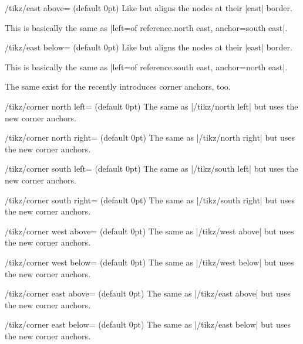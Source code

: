 \begin{stylekey}{/tikz/east above= (default 0pt)}
  Like  but aligns the nodes at their |east| border.
  
  This is basically the same as |left=of reference.north east, anchor=south east|.
\end{stylekey}
\begin{stylekey}{/tikz/east below= (default 0pt)}
  Like  but aligns the nodes at their |east| border.
  
  This is basically the same as |left=of reference.south east, anchor=north east|.
\end{stylekey}

The same exist for the recently introduces corner anchors, too.
\begin{stylekey}{/tikz/corner north left= (default 0pt)}
  The same as |/tikz/north left| but uses the new corner anchors.
\end{stylekey}
\begin{stylekey}{/tikz/corner north right= (default 0pt)}
  The same as |/tikz/north right| but uses the new corner anchors.
\end{stylekey}
\begin{stylekey}{/tikz/corner south left= (default 0pt)}
  The same as |/tikz/south left| but uses the new corner anchors.
\end{stylekey}
\begin{stylekey}{/tikz/corner south right= (default 0pt)}
  The same as |/tikz/south right| but uses the new corner anchors.
\end{stylekey}
\begin{stylekey}{/tikz/corner west above= (default 0pt)}
  The same as |/tikz/west above| but uses the new corner anchors.
\end{stylekey}
\begin{stylekey}{/tikz/corner west below= (default 0pt)}
  The same as |/tikz/west below| but uses the new corner anchors.
\end{stylekey}
\begin{stylekey}{/tikz/corner east above= (default 0pt)}
  The same as |/tikz/east above| but uses the new corner anchors.
\end{stylekey}
\begin{stylekey}{/tikz/corner east below= (default 0pt)}
  The same as |/tikz/east below| but uses the new corner anchors.
\end{stylekey}

